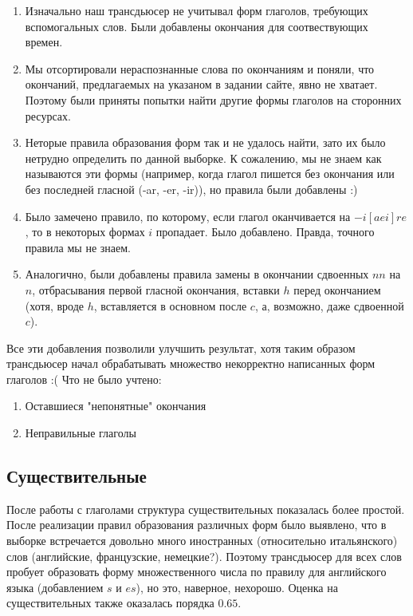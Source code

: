 \documentclass[12pt,a4paper]{article}
\begin{document}
\begin{enumerate}
\item Изначально наш трансдьюсер не учитывал форм глаголов, требующих вспомогальных слов. Были добавлены окончания для соотвествующих времен.
\item Мы отсортировали нераспознанные слова по окончаниям и поняли, что окончаний, предлагаемых на указаном в задании сайте, явно не хватает. Поэтому были приняты попытки найти другие формы глаголов на сторонних ресурсах.
\item Неторые правила образования форм так и не удалось найти, зато их было нетрудно определить по данной выборке. К сожалению, мы не знаем как называются эти формы (например, когда глагол пишется без окончания или без последней гласной (-ar, -er, -ir)), но правила были добавлены :)
\item Было замечено правило, по которому, если глагол оканчивается на $-i[aei]re$, то в некоторых формах $i$ пропадает. Было добавлено. Правда, точного правила мы не знаем.
\item Аналогично, были добавлены правила замены в окончании сдвоенных $nn$ на $n$, отбрасывания первой гласной окончания, вставки $h$ перед окончанием (хотя, вроде $h$, вставляется в основном после $c$, а, возможно, даже сдвоенной $c$).
\end{enumerate}

Все эти добавления позволили улучшить результат, хотя таким образом трансдьюсер начал обрабатывать множество некорректно написанных форм глаголов :( Что не было учтено:

\begin{enumerate}
\item Оставшиеся "непонятные" окончания
\item Неправильные глаголы
\end{enumerate}

\subsection{Существительные}
\indent\indent
После работы с глаголами структура существительных показалась более простой. После реализации правил образования различных форм было выявлено, что в выборке встречается довольно много иностранных (относительно итальянского) слов (английские, французские, немецкие?). Поэтому трансдьюсер для всех слов пробует образовать форму множественного числа по правилу для английского языка (добавлением $s$ и $es$), но это, наверное, нехорошо. Оценка на существительных также оказалась порядка $0.65$.
\end{document}
